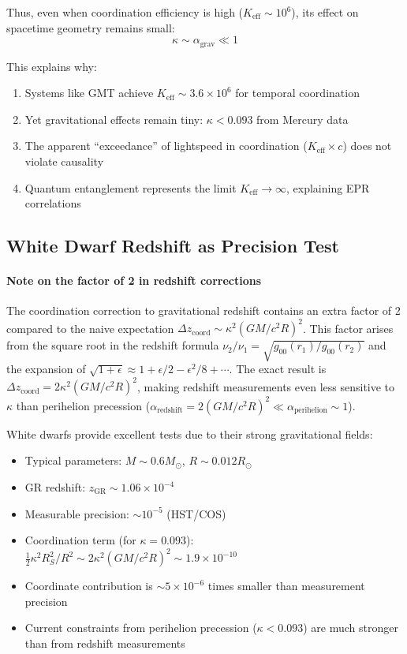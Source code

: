 \documentclass[11pt,a4paper]{article}
\begin{document}
Thus, even when coordination efficiency is high ($K_{\mathrm{eff}} \sim 10^6$), its effect on spacetime geometry remains small:
\[
\kappa \sim \alpha_{\text{grav}} \ll 1
\]

This explains why:
\begin{enumerate}
	\item Systems like GMT achieve $K_{\mathrm{eff}} \sim 3.6\times10^6$ for temporal coordination
	\item Yet gravitational effects remain tiny: $\kappa < 0.093$ from Mercury data
	\item The apparent ``exceedance'' of lightspeed in coordination ($K_{\mathrm{eff}} \times c$) does not violate causality
	\item Quantum entanglement represents the limit $K_{\mathrm{eff}} \to \infty$, explaining EPR correlations
\end{enumerate}	
	\subsection{White Dwarf Redshift as Precision Test}
	\paragraph{Note on the factor of 2 in redshift corrections}
	The coordination correction to gravitational redshift contains an extra factor of 2 compared to the naive expectation $\Delta z_{\text{coord}} \sim \kappa^2 (GM/c^2R)^2$. This factor arises from the square root in the redshift formula $\nu_2/\nu_1 = \sqrt{g_{00}(r_1)/g_{00}(r_2)}$ and the expansion of $\sqrt{1 + \epsilon} \approx 1 + \epsilon/2 - \epsilon^2/8 + \cdots$. The exact result is $\Delta z_{\text{coord}} = 2\kappa^2 (GM/c^2R)^2$, making redshift measurements even less sensitive to $\kappa$ than perihelion precession ($\alpha_{\text{redshift}} = 2(GM/c^2R)^2 \ll \alpha_{\text{perihelion}} \sim 1$).
	
	White dwarfs provide excellent tests due to their strong gravitational fields:
	\begin{itemize}
		\item Typical parameters: $M \sim 0.6 M_\odot$, $R \sim 0.012 R_\odot$
		\item GR redshift: $z_{\text{GR}} \sim 1.06\times10^{-4}$
		\item Measurable precision: $\sim 10^{-5}$ (HST/COS)
		\item Coordination term (for $\kappa = 0.093$): $\frac{1}{2}\kappa^2 R_S^2/R^2 \sim 2\kappa^2 (GM/c^2R)^2 \sim 1.9\times10^{-10}$
		\item Coordinate contribution is $\sim 5\times10^{-6}$ times smaller than measurement precision
		\item Current constraints from perihelion precession ($\kappa < 0.093$) are much stronger than from redshift measurements
	\end{itemize}
\end{document}
